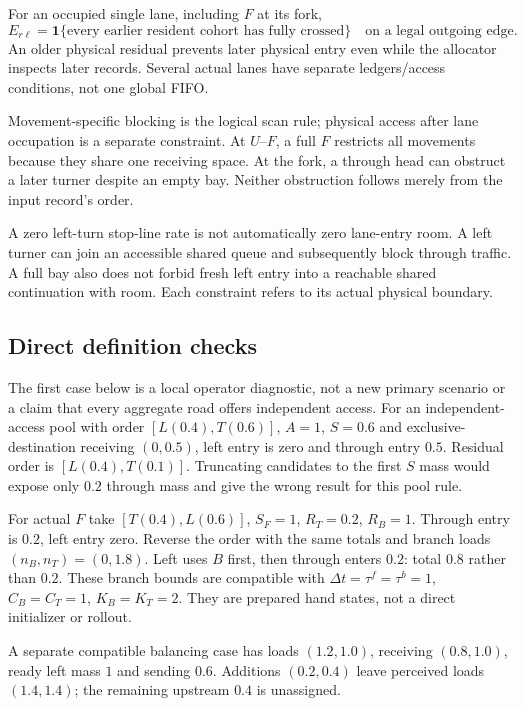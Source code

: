 \documentclass[10pt,a4paper]{article}
\begin{document}
For an occupied single lane, including $F$ at its fork,
\begin{equation}
 E_{r\ell}
 =\mathbf1\{\text{every earlier resident cohort has fully crossed}\}
 \quad\text{on a legal outgoing edge}.
 \label{eq:physical-access}
\end{equation}
An older physical residual prevents later physical entry even while the
allocator inspects later records. Several actual lanes have separate
ledgers/access conditions, not one global FIFO.

Movement-specific blocking is the logical scan rule; physical access
after lane occupation is a separate constraint. At $U$--$F$, a full $F$
restricts all movements because they share one receiving space.
At the fork, a through head can obstruct a later turner despite an empty
bay. Neither obstruction follows merely from the input record's order.

A zero left-turn stop-line rate is not automatically zero lane-entry room.
A left turner can join an accessible shared queue and subsequently block
through traffic. A full bay also does not forbid fresh left entry into
a reachable shared continuation with room. Each constraint refers to its
actual physical boundary.

\subsection*{Direct definition checks}

The first case below is a local operator diagnostic, not a new primary
scenario or a claim that every aggregate road offers independent access.
For an independent-access pool with order $[L(0.4),T(0.6)]$, $A=1$,
$S=0.6$ and exclusive-destination receiving $(0,0.5)$, left entry is
zero and through entry $0.5$. Residual order is $[L(0.4),T(0.1)]$.
Truncating candidates to the first $S$ mass would expose only $0.2$
through mass and give the wrong result for this pool rule.

For actual $F$ take $[T(0.4),L(0.6)]$, $S_F=1$, $R_T=0.2$,
$R_B=1$. Through entry is $0.2$, left entry zero.
Reverse the order with the same totals and branch loads
$(n_B,n_T)=(0,1.8)$. Left uses $B$ first, then through enters $0.2$:
total $0.8$ rather than $0.2$.
These branch bounds are compatible with
$\Delta t=\tau^f=\tau^b=1$, $C_B=C_T=1$, $K_B=K_T=2$.
They are prepared hand states, not a direct initializer or rollout.

A separate compatible balancing case has loads $(1.2,1.0)$,
receiving $(0.8,1.0)$, ready left mass $1$ and sending $0.6$.
Additions $(0.2,0.4)$ leave perceived loads $(1.4,1.4)$;
the remaining upstream $0.4$ is unassigned.
\end{document}
